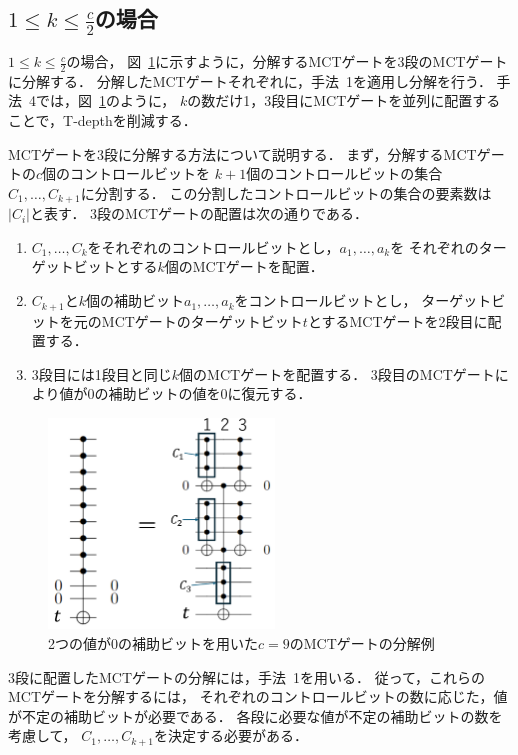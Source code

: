 \subsection*{$1\leq k \leq \frac{c}{2}$の場合}
$1\leq k \leq \frac{c}{2}$の場合，
図~\ref{niemann}に示すように，分解するMCTゲートを3段のMCTゲートに分解する．
分解したMCTゲートそれぞれに，手法~1を適用し分解を行う．
手法~4では，図~\ref{niemann}のように，
$k$の数だけ1，3段目にMCTゲートを並列に配置することで，T-depthを削減する．
\par
MCTゲートを3段に分解する方法について説明する．
まず，分解するMCTゲートの$c$個のコントロールビットを
$k+1$個のコントロールビットの集合$C_{1},\dots,C_{k+1}$に分割する．
この分割したコントロールビットの集合の要素数は$|C_{i}|$と表す．
3段のMCTゲートの配置は次の通りである．
\begin{enumerate}[1段目]
  \item $C_{1},\dots, C_{k}$をそれぞれのコントロールビットとし，$a_{1},\dots,a_{k}$を
  それぞれのターゲットビットとする$k$個のMCTゲートを配置．
  \item $C_{k+1}$と$k$個の補助ビット$a_{1},\dots,a_{k}$をコントロールビットとし，
  ターゲットビットを元のMCTゲートのターゲットビット$t$とするMCTゲートを2段目に配置する．
  \item 3段目には1段目と同じ$k$個のMCTゲートを配置する．
  3段目のMCTゲートにより値が0の補助ビットの値を0に復元する．
\end{enumerate}
\begin{figure}[tbp]
  \centering
  \includegraphics[width=6cm]{img/niemann.pdf}
  \caption{2つの値が0の補助ビットを用いた$c=9$のMCTゲートの分解例}
  \label{niemann}
\end{figure}
\par
3段に配置したMCTゲートの分解には，手法~1を用いる．
従って，これらのMCTゲートを分解するには，
それぞれのコントロールビットの数に応じた，値が不定の補助ビットが必要である．
各段に必要な値が不定の補助ビットの数を考慮して，
$C_{1},\dots,C_{k+1}$を決定する必要がある．

